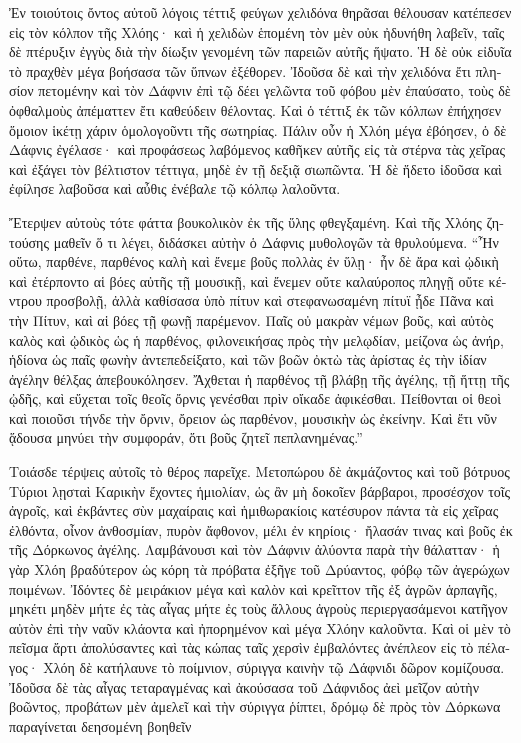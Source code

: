 \documentclass{book}
\begin{document}
\begin{pairs}
\begin{Leftside}
\begin{greek}
  Ἐν τοιούτοις ὄντος αὐτοῦ λόγοις τέττιξ φεύγων χελιδόνα θηρᾶσαι θέλουσαν κατέπεσεν εἰς τὸν κόλπον τῆς Χλόης· καὶ ἡ χελιδὼν ἑπομένη τὸν μὲν οὐκ ἠδυνήθη λαβεῖν, ταῖς δὲ πτέρυξιν ἐγγὺς διὰ τὴν δίωξιν γενομένη τῶν παρειῶν αὐτῆς ἥψατο.  Ἡ δὲ οὐκ εἰδυῖα τὸ πραχθὲν μέγα βοήσασα τῶν ὕπνων ἐξέθορεν. Ἰδοῦσα δὲ καὶ τὴν χελιδόνα ἔτι πλησίον πετομένην καὶ τὸν Δάφνιν ἐπὶ τῷ δέει γελῶντα τοῦ φόβου μὲν ἐπαύσατο, τοὺς δὲ ὀφθαλμοὺς ἀπέματτεν ἔτι καθεύδειν θέλοντας.  Καὶ ὁ τέττιξ ἐκ τῶν κόλπων ἐπήχησεν ὅμοιον ἱκέτῃ χάριν ὁμολογοῦντι τῆς σωτηρίας. Πάλιν οὖν ἡ Χλόη μέγα ἐβόησεν, ὁ δὲ Δάφνις ἐγέλασε· καὶ προφάσεως λαβόμενος καθῆκεν αὐτῆς εἰς τὰ στέρνα τὰς χεῖρας καὶ ἐξάγει τὸν βέλτιστον τέττιγα, μηδὲ ἐν τῇ δεξιᾷ σιωπῶντα. Ἡ δὲ ἥδετο ἰδοῦσα καὶ ἐφίλησε λαβοῦσα καὶ αὖθις ἐνέβαλε τῷ κόλπῳ λαλοῦντα.
\pend


  Ἔτερψεν αὐτοὺς τότε φάττα βουκολικὸν ἐκ τῆς ὕλης φθεγξαμένη. Καὶ τῆς Χλόης ζητούσης μαθεῖν ὅ τι λέγει, διδάσκει αὐτὴν ὁ Δάφνις μυθολογῶν τὰ θρυλούμενα.  “Ἦν οὕτω, παρθένε, παρθένος καλὴ καὶ ἔνεμε βοῦς πολλὰς ἐν ὕλῃ· ἦν δὲ ἄρα καὶ ᾠδικὴ καὶ ἐτέρποντο αἱ βόες αὐτῆς τῇ μουσικῇ, καὶ ἔνεμεν οὔτε καλαύροπος πληγῇ οὔτε κέντρου προσβολῇ, ἀλλὰ καθίσασα ὑπὸ πίτυν καὶ στεφανωσαμένη πίτυϊ ᾖδε Πᾶνα καὶ τὴν Πίτυν, καὶ αἱ βόες τῇ φωνῇ παρέμενον.  Παῖς οὐ μακρὰν νέμων βοῦς, καὶ αὐτὸς καλὸς καὶ ᾠδικὸς ὡς ἡ παρθένος, φιλονεικήσας πρὸς τὴν μελῳδίαν, μείζονα ὡς ἀνήρ, ἡδίονα ὡς παῖς φωνὴν ἀντεπεδείξατο, καὶ τῶν βοῶν ὀκτὼ τὰς ἀρίστας ἐς τὴν ἰδίαν ἀγέλην θέλξας ἀπεβουκόλησεν.  Ἄχθεται ἡ παρθένος τῇ βλάβῃ τῆς ἀγέλης, τῇ ἥττῃ τῆς ᾠδῆς, καὶ εὔχεται τοῖς θεοῖς ὄρνις γενέσθαι πρὶν οἴκαδε ἀφικέσθαι. Πείθονται οἱ θεοὶ καὶ ποιοῦσι τήνδε τὴν ὄρνιν, ὄρειον ὡς παρθένον, μουσικὴν ὡς ἐκείνην. Καὶ ἔτι νῦν ᾅδουσα μηνύει τὴν συμφοράν, ὅτι βοῦς ζητεῖ πεπλανημένας.”
\pend


  Τοιάσδε τέρψεις αὐτοῖς τὸ θέρος παρεῖχε. Μετοπώρου δὲ ἀκμάζοντος καὶ τοῦ βότρυος Τύριοι λῃσταὶ Καρικὴν ἔχοντες ἡμιολίαν, ὡς ἂν μὴ δοκοῖεν βάρβαροι, προσέσχον τοῖς ἀγροῖς, καὶ ἐκβάντες σὺν μαχαίραις καὶ ἡμιθωρακίοις κατέσυρον πάντα τὰ εἰς χεῖρας ἐλθόντα, οἶνον ἀνθοσμίαν, πυρὸν ἄφθονον, μέλι ἐν κηρίοις· ἤλασάν τινας καὶ βοῦς ἐκ τῆς Δόρκωνος ἀγέλης.  Λαμβάνουσι καὶ τὸν Δάφνιν ἀλύοντα παρὰ τὴν θάλατταν· ἡ γὰρ Χλόη βραδύτερον ὡς κόρη τὰ πρόβατα ἐξῆγε τοῦ Δρύαντος, φόβῳ τῶν ἀγερώχων ποιμένων. Ἰδόντες δὲ μειράκιον μέγα καὶ καλὸν καὶ κρεῖττον τῆς ἐξ ἀγρῶν ἁρπαγῆς, μηκέτι μηδὲν μήτε ἐς τὰς αἶγας μήτε ἐς τοὺς ἄλλους ἀγροὺς περιεργασάμενοι κατῆγον αὐτὸν ἐπὶ τὴν ναῦν κλάοντα καὶ ἠπορημένον καὶ μέγα Χλόην καλοῦντα.  Καὶ οἱ μὲν τὸ πεῖσμα ἄρτι ἀπολύσαντες καὶ τὰς κώπας ταῖς χερσὶν ἐμβαλόντες ἀνέπλεον εἰς τὸ πέλαγος· Χλόη δὲ κατήλαυνε τὸ ποίμνιον, σύριγγα καινὴν τῷ Δάφνιδι δῶρον κομίζουσα. Ἰδοῦσα δὲ τὰς αἶγας τεταραγμένας καὶ ἀκούσασα τοῦ Δάφνιδος ἀεὶ μεῖζον αὐτὴν βοῶντος, προβάτων μὲν ἀμελεῖ καὶ τὴν σύριγγα ῥίπτει, δρόμῳ δὲ πρὸς τὸν Δόρκωνα παραγίνεται δεησομένη βοηθεῖν
\pend



\end{greek}
\end{Leftside}
\end{pairs}
\end{document}
